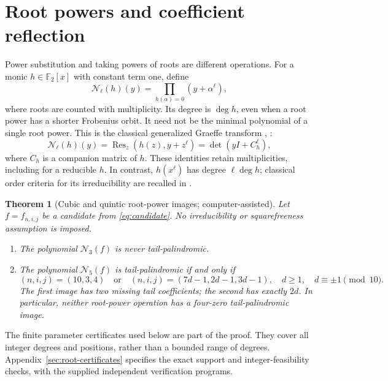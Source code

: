 \documentclass[11pt]{article}
\newtheorem{theorem}[proposition]{Theorem}
\theoremstyle{definition}
\theoremstyle{remark}
\begin{document}
\section{Root powers and coefficient reflection}\label{sec:root-powers}
Power substitution and taking powers of roots are different operations.
For a monic $h\in\mathbb F_2[x]$ with constant term one, define
\begin{equation}\label{eq:root-power-definition}
 \mathcal N_\ell(h)(y)=\prod_{h(\alpha)=0}(y+\alpha^\ell),
\end{equation}
where roots are counted with multiplicity. Its degree is $\deg h$,
even when a root power has a shorter Frobenius orbit. It need not be
the minimal polynomial of a single root power.
This is the classical generalized Graeffe transform
\cite[Section 5]{BFSS06}, \cite[Section 3.1]{GHL15}:
\[
 \mathcal N_\ell(h)(y)
   =\operatorname{Res}_z(h(z),y+z^\ell)
   =\det(yI+C_h^\ell),
\]
where $C_h$ is a companion matrix of $h$.
These identities retain multiplicities, including for a reducible $h$.
In contrast,
$h(x^\ell)$ has degree $\ell\deg h$; classical order criteria for its
irreducibility are recalled in \cite[Section 2]{BM25}.

\begin{theorem}[Cubic and quintic root-power images; computer-assisted]
\label{thm:root-powers}
Let $f=f_{n,i,j}$ be a candidate from \eqref{eq:candidate}.
No irreducibility or squarefreeness assumption is imposed.
\begin{enumerate}
\item The polynomial $\mathcal N_3(f)$ is never tail-palindromic.
\item The polynomial $\mathcal N_5(f)$ is tail-palindromic if and only if
\begin{equation}\label{eq:quintic-parameters}
 (n,i,j)=(10,3,4)
 \quad\text{or}\quad
 (n,i,j)=(7d-1,2d-1,3d-1),
 \quad d\ge1,\quad d\equiv\pm1\pmod {10}.
\end{equation}
The first image has two missing tail coefficients; the second has
exactly $2d$. In particular, neither root-power operation has a
four-zero tail-palindromic image.
\end{enumerate}
\end{theorem}

The finite parameter certificates used below are part of the proof.
They cover all integer degrees and positions, rather than a bounded
range of degrees. Appendix~\ref{sec:root-certificates} specifies the
exact support and integer-feasibility checks, with the supplied
independent verification programs.
\end{document}
